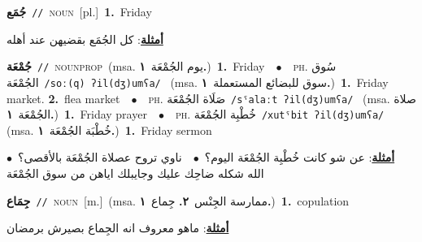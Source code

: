 \documentclass[10pt,a4paper,twoside]{article} %
\begin{document}
\begin{multicols}{2}
{\setlength\topsep{0pt}\textbf{\foreignlanguage{arabic}{جُمَع}}\ {\color{gray}\texttt{//}\color{black}}\ \textsc{noun}\ [pl.]\ \textbf{1.}~Friday\  \begin{flushright}\color{gray}\foreignlanguage{arabic}{\textbf{\underline{\foreignlanguage{arabic}{أمثلة}}}: كل الجُمَع بقضيهن عند أهله}\end{flushright}\color{black}} \vspace{2mm}

{\setlength\topsep{0pt}\textbf{\foreignlanguage{arabic}{جُمْعَة}}\ {\color{gray}\texttt{//}\color{black}}\ \textsc{noun\textunderscore prop}\ \color{gray}(msa. \foreignlanguage{arabic}{يوم الجُمْعَة}~\foreignlanguage{arabic}{\textbf{١.}})\color{black}\ \textbf{1.}~Friday\ \ $\bullet$\ \ \textsc{ph.} \color{gray} \foreignlanguage{arabic}{سُوق الجُمْعَة}\color{black}\ {\color{gray}\texttt{/{\sffamily soː(q) ʔil(dʒ)umʕa}/}\color{black}}\ \color{gray} (msa. \foreignlanguage{arabic}{سوق للبضائع المستعملة}~\foreignlanguage{arabic}{\textbf{١.}})\color{black}\ \textbf{1.}~Friday market.  \textbf{2.}~flea market\ \ $\bullet$\ \ \textsc{ph.} \color{gray} \foreignlanguage{arabic}{صَلَاة الجُمْعَة}\color{black}\ {\color{gray}\texttt{/{\sffamily sˤalaːt ʔil(dʒ)umʕa}/}\color{black}}\ \color{gray} (msa. \foreignlanguage{arabic}{صلاة الجُمْعَة}~\foreignlanguage{arabic}{\textbf{١.}})\color{black}\ \textbf{1.}~Friday prayer\ \ $\bullet$\ \ \textsc{ph.} \color{gray} \foreignlanguage{arabic}{خُطْبِة الجُمْعَة}\color{black}\ {\color{gray}\texttt{/{\sffamily xutˤbit ʔil(dʒ)umʕa}/}\color{black}}\ \color{gray} (msa. \foreignlanguage{arabic}{خُطْبَة الجُمْعَة}~\foreignlanguage{arabic}{\textbf{١.}})\color{black}\ \textbf{1.}~Friday sermon\  \begin{flushright}\color{gray}\foreignlanguage{arabic}{\textbf{\underline{\foreignlanguage{arabic}{أمثلة}}}: عن شو كانت خُطْبِة الجُمْعَة اليوم؟\ $\bullet$\ \  ناوي تروح عصلاة الجُمْعَة بالأقصى؟\ $\bullet$\ \  الله شكله ضاحِك عليك وجايبلك اياهن من سوق الجُمْعَة}\end{flushright}\color{black}} \vspace{2mm}

{\setlength\topsep{0pt}\textbf{\foreignlanguage{arabic}{جِمَاع}}\ {\color{gray}\texttt{//}\color{black}}\ \textsc{noun}\ [m.]\ \color{gray}(msa. \foreignlanguage{arabic}{ممارسة الجِنْس}~\foreignlanguage{arabic}{\textbf{٢.}}  \foreignlanguage{arabic}{جِماع}~\foreignlanguage{arabic}{\textbf{١.}})\color{black}\ \textbf{1.}~copulation\  \begin{flushright}\color{gray}\foreignlanguage{arabic}{\textbf{\underline{\foreignlanguage{arabic}{أمثلة}}}: ماهو معروف انه الجِماع بصيرش برمضان}\end{flushright}\color{black}} \vspace{2mm}


\end{multicols}
\end{document}

